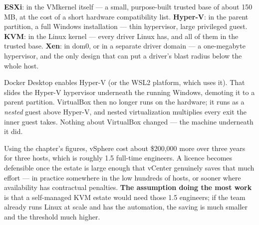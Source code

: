 \begin{ans}
  \item \textbf{ESXi}: in the VMkernel itself --- a small, purpose-built trusted
        base of about 150 MB, at the cost of a short hardware compatibility
        list. \textbf{Hyper-V}: in the parent partition, a full Windows
        installation --- thin hypervisor, large privileged guest.
        \textbf{KVM}: in the Linux kernel --- every driver Linux has, and all of
        them in the trusted base. \textbf{Xen}: in dom0, or in a separate driver
        domain --- a one-megabyte hypervisor, and the only design that can put a
        driver's blast radius below the whole host.
  \item Docker Desktop enables Hyper-V (or the WSL2 platform, which uses it).
        That slides the Hyper-V hypervisor underneath the running Windows,
        demoting it to a parent partition. VirtualBox then no longer runs on the
        hardware; it runs as a \emph{nested} guest above Hyper-V, and nested
        virtualization multiplies every exit the inner guest takes. Nothing
        about VirtualBox changed --- the machine underneath it did.
  \item Using the chapter's figures, vSphere cost about \$200{,}000 more over
        three years for three hosts, which is roughly 1.5 full-time engineers.
        A licence becomes defensible once the estate is large enough that
        vCenter genuinely saves that much effort --- in practice somewhere in
        the low hundreds of hosts, or sooner where availability has contractual
        penalties. \textbf{The assumption doing the most work} is that a
        self-managed KVM estate would need those 1.5 engineers; if the team
        already runs Linux at scale and has the automation, the saving is much
        smaller and the threshold much higher.
\end{ans}

